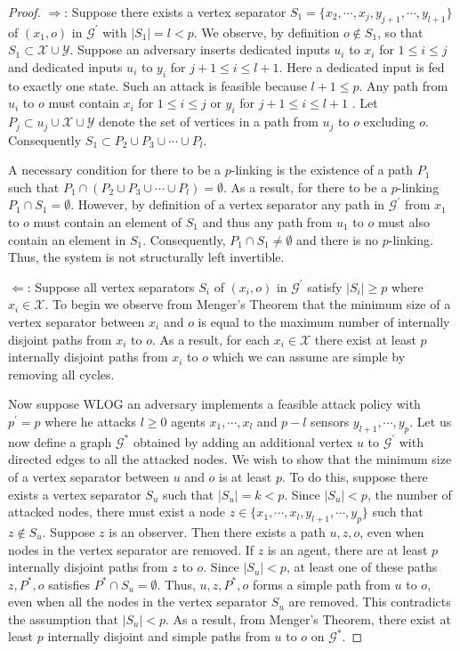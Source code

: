 \documentclass[letterpaper, 10 pt, conference]{ieeeconf}
\begin{document}
\begin{proof}
\textbf{ $\Rightarrow$}:
Suppose there exists a vertex separator $S_1 = \{x_2, \cdots, x_j, y_{j+1}, \cdots,  y_{l+1}\}$ of  $(x_1,o)$  in $\mathcal{G}^\prime$  with $|S_1| = l < p$. We observe, by definition $o \notin S_1$, so that $S_1 \subset \mathcal{X} \cup \mathcal{Y}$. Suppose an adversary inserts dedicated inputs $u_i$ to $x_i$ for $1 \le i \le j$ and dedicated inputs $u_i$ to $y_i$ for $j+1 \le i \le l+1$. Here a dedicated input is fed to exactly one state. Such an attack is feasible because $l + 1 \le p$. Any path from $u_i$ to $o$ must contain $x_i$ for $1 \le i \le j$ or $y_i$ for $j+1 \le i \le l+1$ . Let $P_j \subset u_j \cup \mathcal{X} \cup \mathcal{Y}$ denote the set of vertices in a path from $u_j$ to $o$ excluding $o$. Consequently $S_1 \subset P_2 \cup P_3 \cup \cdots \cup P_l$. 

A necessary condition for there to be a $p$-linking is the existence of a path $P_1$ such that $P_1 \cap ( P_2 \cup P_3 \cup \cdots \cup P_l) = \emptyset$. As a result, for there to be a $p$-linking $P_1 \cap S_1 = \emptyset$. However, by definition of a vertex separator any path in $\mathcal{G}^\prime$ from $x_1$ to $o$ must contain an element of $S_1$ and thus any path from $u_1$ to $o$ must also contain an element in $S_1$. Consequently, $P_1 \cap S_1 \neq \emptyset$ and there is no $p$-linking. Thus, the system is not structurally left invertible.

\textbf{$\Leftarrow$}:
Suppose all vertex separators $S_i$ of $(x_i,o)$ in $\mathcal{G}^\prime$ satisfy $|S_i| \ge p$ where $x_i \in \mathcal{X}$. To begin we observe from Menger's Theorem \cite{Menger1927} that the minimum size of a vertex separator between $x_i$ and $o$ is equal to the maximum number of internally disjoint paths from $x_i$ to $o$. As a result, for each $x_i \in \mathcal{X}$ there exist at least $p$ internally disjoint paths from $x_i$ to $o$ which we can assume are simple by removing all cycles.

Now suppose WLOG an adversary implements a feasible attack policy with $p^\prime = p$ where he attacks $l \ge 0$ agents $x_1, \cdots, x_l$ and $p - l$ sensors $y_{l+1}, \cdots, y_p$. Let us now define a graph $\mathcal{G}^*$ obtained by adding an additional vertex $u$ to $\mathcal{G}^\prime$ with directed edges to all the attacked nodes. We wish to show that the minimum size of a vertex separator between $u$ and $o$ is at least $p$.  To do this, suppose there exists a vertex separator $S_u$ such that $|S_u| = k < p$. Since $|S_u| < p$, the number of attacked nodes, there must exist a node $z \in \{x_1, \cdots, x_l,y_{l+1}, \cdots, y_p\}$ such that $z\notin S_u$. Suppose $z$ is an observer. Then there exists a path $u, z, o$, even when nodes in the vertex separator are removed. If $z$ is an agent, there are at least $p$ internally disjoint paths from $z$ to $o$. Since $|S_u| < p$, at least one of these paths $z, P^*, o$ satisfies $P^* \cap S_u = \emptyset$. Thus, $u, z, P^*, o$ forms a simple path from $u$ to $o$, even when all the nodes in the vertex separator $S_u$ are removed. This contradicts the assumption that $|S_u| < p$. As a result, from Menger's Theorem, there exist at least $p$ internally disjoint and simple paths from $u$ to $o$ on $\mathcal{G}^*$.


\end{proof}
\end{document}
